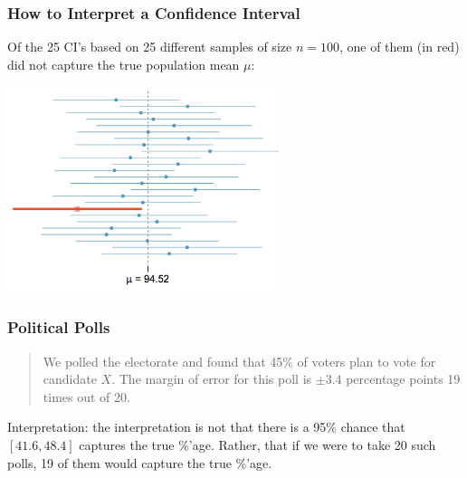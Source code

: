 \documentclass[handout]{beamer}
\newcommand{\blue}[1]{\textcolor{blue2}{#1}}
\begin{document}
\begin{frame}
\frametitle{How to Interpret a Confidence Interval}
Of the 25 CI's based on 25 different samples of size $n=100$, one of them (in red) did not capture the true population mean $\mu$:

\begin{center}
\includegraphics[width=8cm]{figure/CI.png}
\end{center}

\end{frame}


\begin{frame}
\frametitle{Political Polls}
\begin{quotation}
\noindent We polled the electorate and found that 45\% of voters plan to vote for candidate $X$.  The margin of error for this poll is $\pm 3.4$ percentage points 19 times out of 20.  
\end{quotation}

%
%

\vspace{1 cm}

\pause \blue{Interpretation}: the interpretation is not that there is a 95\% chance that $[41.6, 48.4]$ captures the true \%'age.  Rather, that if we were to take 20 such polls, 19 of them would capture the true \%'age.
\end{frame}
\end{document}
